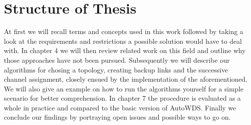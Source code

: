 \section{Structure of Thesis}
  At first we will recall terms and concepts used in this work followed by taking a look at the requirements and restrictions a possible solution would have to deal with.
  In chapter 4 we will then review related work on this field and outline why those approaches have not been pursued.
  Subsequently we will describe our algorithms for chosing a topology, creating backup links and the successive channel assignment, closely ensued by the implementation of 
  the aforementioned. We will also give an example on how to run the algorithms yourself for a simple scenario for better comprehension.
  In chapter 7 the procedure is evaluated as a whole in practice and compared to the basic version of AutoWDS.
  Finally we conclude our findings by portraying open issues and possible ways to go on.
